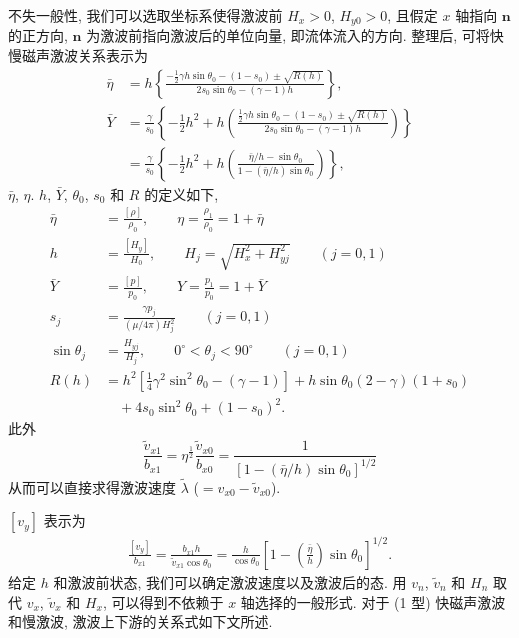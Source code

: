 \documentclass[10.5pt
]{article}
\begin{document}
不失一般性, 我们可以选取坐标系使得激波前 $H_x > 0$, $H_{y0} > 0$, 且假定 $x$ 轴指向 $\boldsymbol{n}$ 的正方向, $\boldsymbol{n}$ 为激波前指向激波后的单位向量,
即流体流入的方向. 整理后, 可将快慢磁声激波关系表示为
\begin{align}
\bar{\eta} &= h\left\{\frac{-\frac{1}{2}\gamma h \sin\theta_0 -
(1-s_0) \pm
\sqrt{R(h)}}{2 s_0 \sin\theta_0 - (\gamma-1) h}\right\},\label{Eqn:6.2.15}
\\
\bar{Y} &= \frac{\gamma}{s_0} \left\{-\frac{1}{2} h^2 +
h\left(\frac{\frac{1}{2}\gamma h \sin\theta_0 - (1-s_0) \pm
\sqrt{R(h)}}{2 s_0 \sin\theta_0 - (\gamma-1) h}\right)\right\}\label{Eqn:6.2.16a}
\\
&= \frac{\gamma}{s_0} \left\{-\frac{1}{2} h^2 +
h\left(\frac{\bar{\eta}/h - \sin\theta_0}{1 - (\bar{\eta}/h)
\sin\theta_0}\right)\right\},\label{Eqn:6.2.16b}
\end{align}
$\bar{\eta}$, $\eta$. $h$, $\bar{Y}$, $\theta_0$, $s_0$ 和 $R$ 的定义如下,
\begin{align}
\bar{\eta} &= \frac{[\rho]}{\rho_0}, \qquad \eta = \frac{\rho_1}{\rho_0} = 1 + \bar{\eta} \nonumber\\
h &= \frac{[H_y]}{H_0}, \qquad H_j = \sqrt{H_x^2+H_{yj}^2} \qquad (j=0,1) \nonumber\\
\bar{Y} &= \frac{[p]}{p_0}, \qquad Y = \frac{p_1}{p_0} = 1 + \bar{Y} \nonumber\\
s_j &= \frac{\gamma p_j}{(\mu/4\pi)H_j^2} \qquad (j=0,1) \nonumber\\
\sin\theta_j &= \frac{H_{yj}}{H_j}, \qquad 0^\circ < \theta_j < 90^\circ \qquad (j=0,1) \nonumber\\
R(h) &= h^2[\frac{1}{4} \gamma^2 \sin^2\theta_0 - (\gamma-1)] + h\sin\theta_0
(2-\gamma)(1+s_0)
\nonumber\\
& \quad + 4s_0 \sin^2\theta_0 + (1-s_0)^2.\label{Eqn:6.2.17}
\end{align}
此外
\begin{equation}
\frac{\tilde{v}_{x1}}{b_{x1}} = \eta^{\frac{1}{2}} \frac{\tilde{v}_{x0}}{b_{x0}} =
\frac{1}{[1-(\bar{\eta}/h) \sin\theta_0]^{1/2}}
\end{equation}
从而可以直接求得激波速度 $\tilde{\lambda}$ ($=v_{x0}-\tilde{v}_{x0}$).

$[v_y]$ 表示为
\begin{align}\label{Eqn:6.2.18a}
\frac{[v_y]}{b_{x1}} = \frac{b_{x1} h}{\tilde{v}_{x1} \cos\theta_0} =
\frac{h}{\cos\theta_0} \left[1 - \left(\frac{\bar{\eta}}{h}\right)
\sin\theta_0\right]^{1/2}.
\end{align}
给定 $h$ 和激波前状态, 我们可以确定激波速度以及激波后的态. 用 $v_n$, $\tilde{v}_n$ 和 $H_n$ 取代 $v_x$, $\tilde v_x$ 和 $H_x$,
可以得到不依赖于 $x$ 轴选择的一般形式. 对于 (1 型) 快磁声激波和慢激波, 激波上下游的关系式如下文所述.
\end{document}
